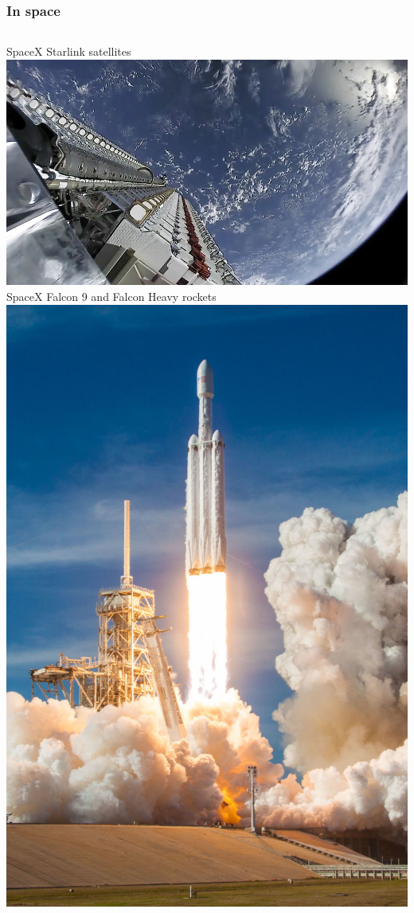 \begin{frame}
\frametitle{In space}
  \begin{columns}
  \scriptsize
  SpaceX Starlink satellites\\
  \includegraphics[height=0.3\textheight]{slides/sysdev-intro/starlink.jpg}\\
  SpaceX Falcon 9 and Falcon Heavy rockets\\
  \includegraphics[height=0.3\textheight]{slides/sysdev-intro/falcon-heavy.jpg}\\

\end{columns}
\end{frame}
